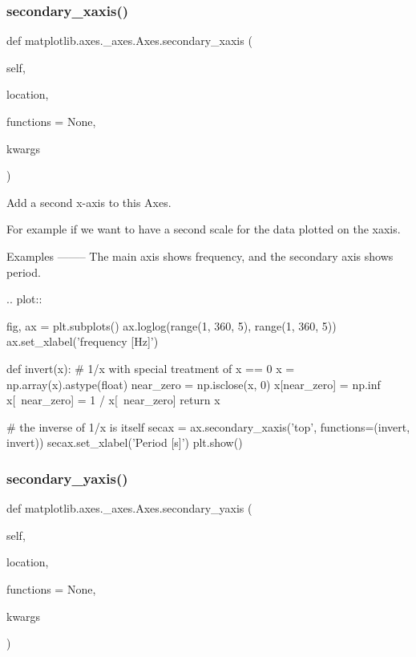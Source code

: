 \begin{DoxyVerb}
\subsubsection{\texorpdfstring{secondary\+\_\+xaxis()}{secondary\_xaxis()}}
{\footnotesize\ttfamily def matplotlib.\+axes.\+\_\+axes.\+Axes.\+secondary\+\_\+xaxis (\begin{DoxyParamCaption}\item[{}]{self,  }\item[{}]{location,  }\item[{}]{functions = {\ttfamily None},  }\item[{}]{kwargs }\end{DoxyParamCaption})}

\begin{DoxyVerb}Add a second x-axis to this Axes.

For example if we want to have a second scale for the data plotted on
the xaxis.


Examples
--------
The main axis shows frequency, and the secondary axis shows period.

.. plot::

    fig, ax = plt.subplots()
    ax.loglog(range(1, 360, 5), range(1, 360, 5))
    ax.set_xlabel('frequency [Hz]')

    def invert(x):
# 1/x with special treatment of x == 0
x = np.array(x).astype(float)
near_zero = np.isclose(x, 0)
x[near_zero] = np.inf
x[~near_zero] = 1 / x[~near_zero]
return x

    # the inverse of 1/x is itself
    secax = ax.secondary_xaxis('top', functions=(invert, invert))
    secax.set_xlabel('Period [s]')
    plt.show()
\end{DoxyVerb}
 \mbox{\label{classmatplotlib_1_1axes_1_1__axes_1_1Axes_acf4a04410d25a648d77e2eb3045a2669}} 
\subsubsection{\texorpdfstring{secondary\+\_\+yaxis()}{secondary\_yaxis()}}
{\footnotesize\ttfamily def matplotlib.\+axes.\+\_\+axes.\+Axes.\+secondary\+\_\+yaxis (\begin{DoxyParamCaption}\item[{}]{self,  }\item[{}]{location,  }\item[{}]{functions = {\ttfamily None},  }\item[{}]{kwargs }\end{DoxyParamCaption})}


\end{DoxyVerb}
